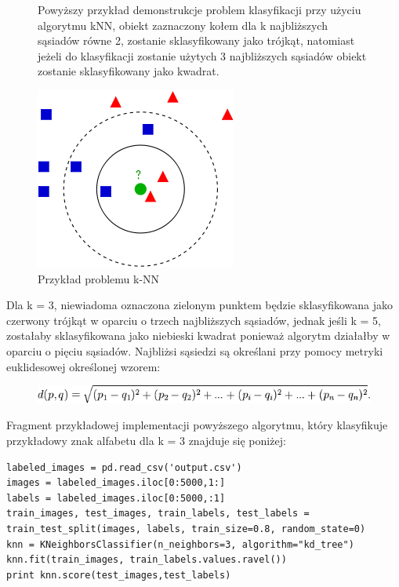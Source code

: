 \documentclass[brudnopis]{xmgr}
\begin{document}
\begin{figure}[!tbh]

Powyższy przykład demonstrukcje problem klasyfikacji przy użyciu algorytmu kNN, obiekt zaznaczony kołem dla k najbliższych sąsiadów równe 2, zostanie sklasyfikowany jako trójkąt, natomiast jeżeli do klasyfikacji zostanie użytych 3 najbliższych sąsiadów obiekt zostanie sklasyfikowany jako kwadrat.

\centering
\includegraphics[width=.6\hsize]{fig/knn}
\caption{Przykład problemu k-NN}
\end{figure}
\newpage
Dla k = 3, niewiadoma oznaczona zielonym punktem będzie sklasyfikowana jako czerwony trójkąt w oparciu o trzech najbliższych sąsiadów, jednak jeśli k = 5, zostałaby sklasyfikowana jako niebieski kwadrat ponieważ algorytm działałby w oparciu o pięciu sąsiadów. Najbliżsi sąsiedzi są określani przy pomocy metryki euklidesowej określonej wzorem:

\begin{figure}[!tbh]
\centering
\includegraphics[width=.8\hsize]{fig/knn-wzor}
\end{figure}

Fragment przykładowej implementacji powyższego algorytmu, który klasyfikuje przykładowy znak alfabetu dla k = 3 znajduje się poniżej:

\lstset{language=Python} 
\begin{lstlisting}
labeled_images = pd.read_csv('output.csv')
images = labeled_images.iloc[0:5000,1:]
labels = labeled_images.iloc[0:5000,:1]
train_images, test_images, train_labels, test_labels = train_test_split(images, labels, train_size=0.8, random_state=0)
knn = KNeighborsClassifier(n_neighbors=3, algorithm="kd_tree")
knn.fit(train_images, train_labels.values.ravel())
print knn.score(test_images,test_labels)
\end{lstlisting}
\end{document}
